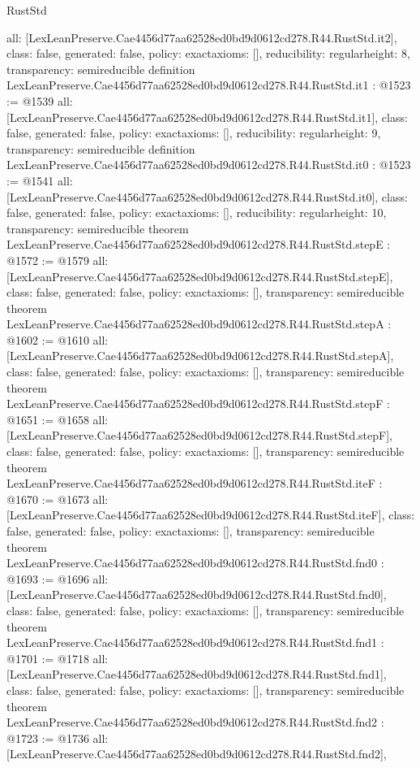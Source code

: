 \begin{lexlean}{RustStd}
\begin{coremodule}
{  all: [LexLeanPreserve.Cae4456d77aa62528ed0bd9d0612cd278.R44.RustStd.it2],
  class: false,
  generated: false,
  policy: exact{axioms: []},
  reducibility: regular{height: 8},
  transparency: semireducible
}
definition LexLeanPreserve.Cae4456d77aa62528ed0bd9d0612cd278.R44.RustStd.it1 : @1523 := @1539 {
  all: [LexLeanPreserve.Cae4456d77aa62528ed0bd9d0612cd278.R44.RustStd.it1],
  class: false,
  generated: false,
  policy: exact{axioms: []},
  reducibility: regular{height: 9},
  transparency: semireducible
}
definition LexLeanPreserve.Cae4456d77aa62528ed0bd9d0612cd278.R44.RustStd.it0 : @1523 := @1541 {
  all: [LexLeanPreserve.Cae4456d77aa62528ed0bd9d0612cd278.R44.RustStd.it0],
  class: false,
  generated: false,
  policy: exact{axioms: []},
  reducibility: regular{height: 10},
  transparency: semireducible
}
theorem LexLeanPreserve.Cae4456d77aa62528ed0bd9d0612cd278.R44.RustStd.stepE : @1572 := @1579 {
  all: [LexLeanPreserve.Cae4456d77aa62528ed0bd9d0612cd278.R44.RustStd.stepE],
  class: false,
  generated: false,
  policy: exact{axioms: []},
  transparency: semireducible
}
theorem LexLeanPreserve.Cae4456d77aa62528ed0bd9d0612cd278.R44.RustStd.stepA : @1602 := @1610 {
  all: [LexLeanPreserve.Cae4456d77aa62528ed0bd9d0612cd278.R44.RustStd.stepA],
  class: false,
  generated: false,
  policy: exact{axioms: []},
  transparency: semireducible
}
theorem LexLeanPreserve.Cae4456d77aa62528ed0bd9d0612cd278.R44.RustStd.stepF : @1651 := @1658 {
  all: [LexLeanPreserve.Cae4456d77aa62528ed0bd9d0612cd278.R44.RustStd.stepF],
  class: false,
  generated: false,
  policy: exact{axioms: []},
  transparency: semireducible
}
theorem LexLeanPreserve.Cae4456d77aa62528ed0bd9d0612cd278.R44.RustStd.iteF : @1670 := @1673 {
  all: [LexLeanPreserve.Cae4456d77aa62528ed0bd9d0612cd278.R44.RustStd.iteF],
  class: false,
  generated: false,
  policy: exact{axioms: []},
  transparency: semireducible
}
theorem LexLeanPreserve.Cae4456d77aa62528ed0bd9d0612cd278.R44.RustStd.fnd0 : @1693 := @1696 {
  all: [LexLeanPreserve.Cae4456d77aa62528ed0bd9d0612cd278.R44.RustStd.fnd0],
  class: false,
  generated: false,
  policy: exact{axioms: []},
  transparency: semireducible
}
theorem LexLeanPreserve.Cae4456d77aa62528ed0bd9d0612cd278.R44.RustStd.fnd1 : @1701 := @1718 {
  all: [LexLeanPreserve.Cae4456d77aa62528ed0bd9d0612cd278.R44.RustStd.fnd1],
  class: false,
  generated: false,
  policy: exact{axioms: []},
  transparency: semireducible
}
theorem LexLeanPreserve.Cae4456d77aa62528ed0bd9d0612cd278.R44.RustStd.fnd2 : @1723 := @1736 {
  all: [LexLeanPreserve.Cae4456d77aa62528ed0bd9d0612cd278.R44.RustStd.fnd2],
}
\end{coremodule}
\end{lexlean}
